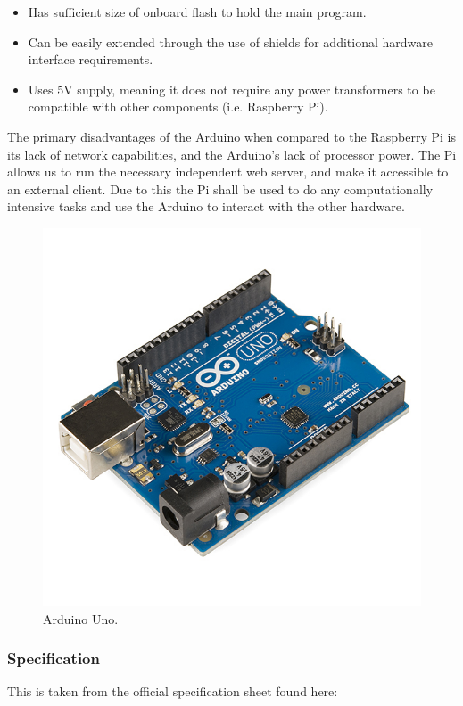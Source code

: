 \documentclass[11pt, a4paper]{article}
\begin{document}
\begin{itemize}
	\item Has sufficient size of onboard flash to hold the main program.
	\item Can be easily extended through the use of shields for additional
	hardware interface requirements.
	\item Uses 5V supply, meaning it does not require any power transformers to
	be compatible with other components (i.e. Raspberry Pi).
\end{itemize}

The primary disadvantages of the Arduino when compared to the Raspberry Pi is
its lack of network capabilities, and the Arduino's lack of processor power.
The Pi allows us to run the necessary independent web server, and make it
accessible to an external client. Due to this the Pi shall be used to do any
computationally intensive tasks and use the Arduino to interact with the other
hardware.

\begin{figure}[H]
    \centering
    \includegraphics[scale = 0.25]{images/arduino-uno}
    \caption{Arduino Uno.\cite{ArduinoImage}}
    \label{fig:arduino_uno}
\end{figure}

\newpage

\subsubsection{Specification}
This is taken from the official specification sheet found here\cite{Arduino}:
\end{document}

